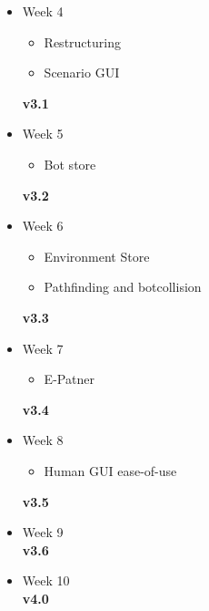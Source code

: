 \begin{itemize}
	\item Week 4
	\begin{itemize}
	\item Restructuring
	\item	Scenario GUI
\end{itemize}
	\textbf{v3.1}
	\item Week 5
	\begin{itemize}
	\item Bot store
\end{itemize}
	\textbf{v3.2}
	\item Week 6
	\begin{itemize}
	\item Environment Store
	\item	Pathfinding and botcollision
\end{itemize}
	\textbf{v3.3}
	\item Week 7
	\begin{itemize}
	\item E-Patner
\end{itemize}
	\textbf{v3.4}
	\item Week 8
	\begin{itemize}
	\item Human GUI ease-of-use
\end{itemize}
	\textbf{v3.5}
	\item Week 9 \\
	\textbf{v3.6}
	\item Week 10 \\
	\textbf{v4.0}
\end{itemize}
